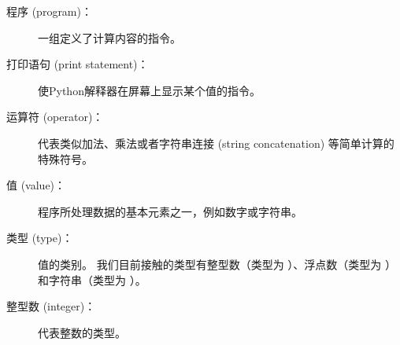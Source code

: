 \begin{description}

\item[程序 (program)：] 一组定义了计算内容的指令。
  


\item[打印语句 (print statement)：]  使Python解释器在屏幕上显示某个值的指令。
  
  


\item[运算符 (operator)：]  代表类似加法、乘法或者字符串连接 (string concatenation) 等简单计算的特殊符号。
  


\item[值 (value)：]  程序所处理数据的基本元素之一，例如数字或字符串。
  


\item[类型 (type)：] 值的类别。 我们目前接触的类型有整型数（类型为 ）、浮点数（类型为  ）和字符串（类型为  ）。
  


\item[整型数 (integer)：] 代表整数的类型。
  



\end{description}

